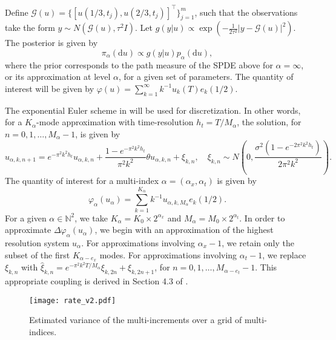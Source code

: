 \documentclass[english]{article}
\newcommand{\dif}{\mathrm{d}}
\begin{document}
Define $\mathcal{G}(u) = \{[u(1/3,t_j),u(2/3,t_j)]^\top\}_{j=1}^{m}$,
such that the observations take the form $y\sim N(\mathcal{G}(u),\tau^2 I)$. 
Let $g(y|u) \propto \exp(-\frac1{2\tau^2}|y-\mathcal{G}(u)|^2)$.
The posterior is given by
\begin{equation}\label{eq:posterior}
\pi_\alpha(\dif u) \propto g(y| u) p_\alpha(\dif u),
\end{equation}
where the prior corresponds %
to the path measure of the SPDE above for $\alpha = \infty$, 
or its approximation at level $\alpha$, for a given set of parameters. 
{ The quantity of interest will be given by 
$\varphi(u) = \sum_{k=1}^\infty k^{-1} u_k(T) e_k(1/2)$.}

The exponential Euler scheme in \cite{spde_disc} %
will be used for %
discretization.  In other words, 
for a $K_\alpha$-mode approximation with time-resolution
$h_t=T/M_\alpha$, the solution, for $n=0,1,\dots,M_\alpha-1$, is given by
$$
u_{\alpha,k,n+1} = e^{-\pi^2k^2h_t}u_{\alpha,k,n} + 
\frac{1-e^{-\pi^2 k^2 h_t}}{\pi^2 k^2} \theta  u_{\alpha,k,n} +
\xi_{k,n}, \quad \xi_{k,n}\sim N\left ( 0, \frac{\sigma^2(1-e^{-2\pi^2k^2h_t})}{2\pi^2k^2}\right ).
$$
The quantity of interest for a multi-index $\alpha=(\alpha_x, \alpha_t)$ is given by 
$$
\varphi_\alpha(u_\alpha) =  \sum_{k=1}^{K_\alpha} { k^{-1}} u_{\alpha,k,M_\alpha} e_k(1/2). 
$$
For a given $\alpha\in \mathbb{N}^2$, we take 
$K_\alpha=K_0\times2^{\alpha_x}$ and 
$M_\alpha=M_0 \times 2^{\alpha_t}$.
In order to approximate $\Delta \varphi_\alpha(u_\alpha)$, 
we begin with an approximation of the highest resolution system $u_\alpha$.
For approximations involving $\alpha_x-1$, 
we retain only the subset of the first $K_{\alpha-e_x}$ modes.
{ For approximations involving $\alpha_t-1$,
we replace $\xi_{k,n}$ with 
$\hat \xi_{k,n} = e^{-\pi^2k^2T/M_\alpha}\xi_{k,2n} + \xi_{k,2n+1}$, 
for $n=0,1,\dots, M_{\alpha-e_t}-1$.  
This appropriate coupling is derived in Section 4.3 of \cite{chernov2016multilevel}. } 

\begin{figure}
  \texttt{[image: rate\_v2.pdf]}
  \caption{Estimated variance of the multi-increments over a grid of multi-indices.}
  \label{fig:rates}
\end{figure}
\end{document}
